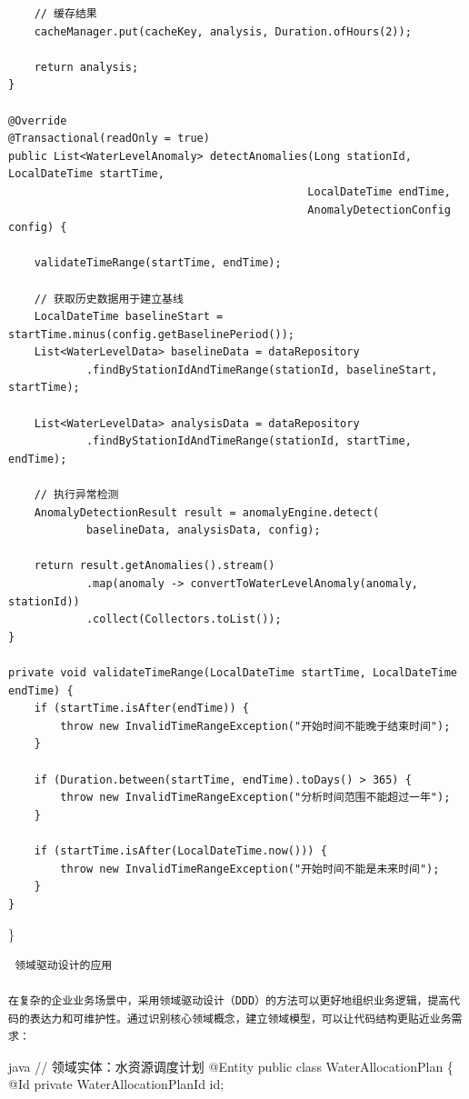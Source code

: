 \begin{verbatim}
    // 缓存结果
    cacheManager.put(cacheKey, analysis, Duration.ofHours(2));
    
    return analysis;
}

@Override
@Transactional(readOnly = true)  
public List<WaterLevelAnomaly> detectAnomalies(Long stationId, LocalDateTime startTime,
                                              LocalDateTime endTime,
                                              AnomalyDetectionConfig config) {
    
    validateTimeRange(startTime, endTime);
    
    // 获取历史数据用于建立基线
    LocalDateTime baselineStart = startTime.minus(config.getBaselinePeriod());
    List<WaterLevelData> baselineData = dataRepository
            .findByStationIdAndTimeRange(stationId, baselineStart, startTime);
            
    List<WaterLevelData> analysisData = dataRepository
            .findByStationIdAndTimeRange(stationId, startTime, endTime);
    
    // 执行异常检测
    AnomalyDetectionResult result = anomalyEngine.detect(
            baselineData, analysisData, config);
    
    return result.getAnomalies().stream()
            .map(anomaly -> convertToWaterLevelAnomaly(anomaly, stationId))
            .collect(Collectors.toList());
}

private void validateTimeRange(LocalDateTime startTime, LocalDateTime endTime) {
    if (startTime.isAfter(endTime)) {
        throw new InvalidTimeRangeException("开始时间不能晚于结束时间");
    }
    
    if (Duration.between(startTime, endTime).toDays() > 365) {
        throw new InvalidTimeRangeException("分析时间范围不能超过一年");
    }
    
    if (startTime.isAfter(LocalDateTime.now())) {
        throw new InvalidTimeRangeException("开始时间不能是未来时间");
    }
}
\end{verbatim}

\}

\begin{lstlisting}
 领域驱动设计的应用

在复杂的企业业务场景中，采用领域驱动设计（DDD）的方法可以更好地组织业务逻辑，提高代码的表达力和可维护性。通过识别核心领域概念，建立领域模型，可以让代码结构更贴近业务需求：
\end{lstlisting}

java // 领域实体：水资源调度计划 @Entity public class WaterAllocationPlan \{ @Id private WaterAllocationPlanId id;

